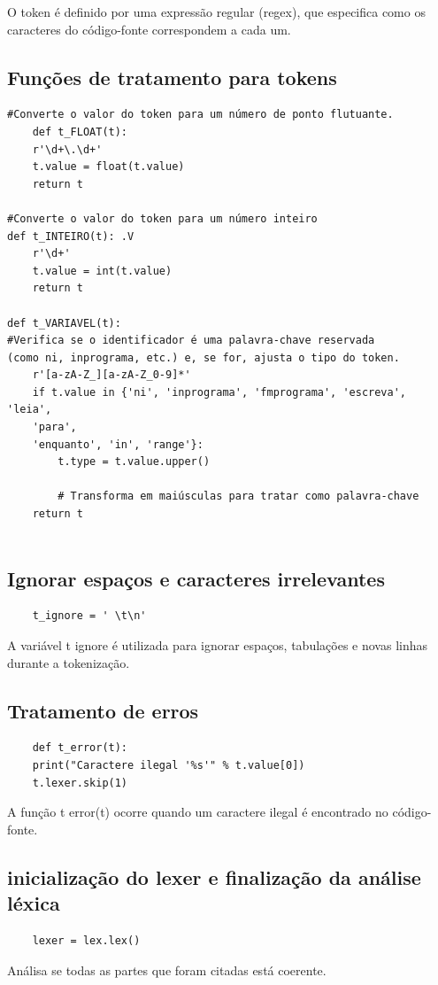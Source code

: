 \documentclass[a4paper,12pt]{article}
\begin{document}
O token é definido por uma expressão regular (regex), que especifica 
como os caracteres do código-fonte correspondem a cada um.

\subsection{Funções de tratamento para tokens}

\begin{Verbatim}
#Converte o valor do token para um número de ponto flutuante.
    def t_FLOAT(t): 
    r'\d+\.\d+'
    t.value = float(t.value)
    return t
    
#Converte o valor do token para um número inteiro
def t_INTEIRO(t): .V
    r'\d+'
    t.value = int(t.value)
    return t

def t_VARIAVEL(t): 
#Verifica se o identificador é uma palavra-chave reservada 
(como ni, inprograma, etc.) e, se for, ajusta o tipo do token.
    r'[a-zA-Z_][a-zA-Z_0-9]*'
    if t.value in {'ni', 'inprograma', 'fmprograma', 'escreva', 'leia', 
    'para', 
    'enquanto', 'in', 'range'}:
        t.type = t.value.upper()  
        
        # Transforma em maiúsculas para tratar como palavra-chave
    return t
    
\end{Verbatim}

\subsection{Ignorar espaços e caracteres irrelevantes}

\begin{verbatim}
    t_ignore = ' \t\n'
\end{verbatim}

A variável t ignore é utilizada para ignorar espaços, tabulações e novas 
linhas durante a tokenização.

\subsection{Tratamento de erros}
\begin{verbatim}
    def t_error(t):
    print("Caractere ilegal '%s'" % t.value[0])
    t.lexer.skip(1)

\end{verbatim}
A função t error(t) ocorre quando um caractere ilegal é encontrado no 
código-fonte.

\subsection{inicialização do lexer e finalização da análise léxica}
\begin{verbatim}
    lexer = lex.lex()
\end{verbatim}
Análisa se todas as partes que foram citadas está coerente.
\end{document}
